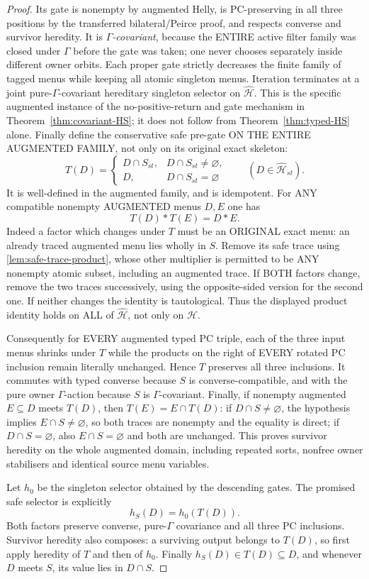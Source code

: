 \begin{proof}
Its gate is nonempty by augmented Helly,
is PC-preserving in all three positions
by the transferred bilateral/Peirce
proof, and respects converse and
survivor heredity. It is
\emph{$\Gamma$-covariant}, because the
ENTIRE active filter family was closed
under $\Gamma$ before the gate was taken;
one never chooses separately inside
different owner orbits.
Each proper gate strictly decreases the finite family of tagged
menus while keeping all atomic singleton menus.  Iteration
terminates at a joint pure-$\Gamma$-covariant hereditary
singleton selector on $\widehat{\mathcal H}$.  This is the
specific augmented instance of the no-positive-return and
gate mechanism in Theorem~\ref{thm:covariant-HS}; it does
not follow from Theorem~\ref{thm:typed-HS} alone.
Finally define the conservative safe
pre-gate ON THE ENTIRE AUGMENTED FAMILY,
not only on its original exact skeleton:
\[
 T(D)=\begin{cases}
    D\cap S_{st},&D\cap S_{st}\ne\varnothing,\\
    D,&D\cap S_{st}=\varnothing
      \end{cases}
      \qquad(D\in\widehat{\mathcal H}_{st}).
\]
It is well-defined in the augmented family,
and is idempotent. For ANY compatible
nonempty AUGMENTED menus $D,E$ one has
\[
                         T(D)*T(E)=D*E.
\]
Indeed a factor which changes under $T$
must be an ORIGINAL exact menu: an
already traced augmented menu lies wholly
in $S$. Remove its safe trace using
\cref{lem:safe-trace-product}, whose
other multiplier is permitted to be
ANY nonempty atomic subset, including an
augmented trace. If BOTH factors change,
remove the two traces successively,
using the opposite-sided version for
the second one. If neither changes the
identity is tautological. Thus the
displayed product identity holds on
ALL of $\widehat{\mathcal H}$, not only
on $\mathcal H$.

Consequently for EVERY augmented
typed PC triple, each of the three
input menus shrinks under $T$ while
the products on the right of EVERY
rotated PC inclusion remain literally
unchanged. Hence $T$ preserves all
three inclusions. It commutes with
typed converse because $S$ is
converse-compatible, and with the
pure owner $\Gamma$-action because
$S$ is $\Gamma$-covariant.
Finally, if nonempty augmented
$E\subseteq D$ meets $T(D)$,
then $T(E)=E\cap T(D)$:
if $D\cap S\ne\varnothing$, the
hypothesis implies $E\cap S\ne
\varnothing$, so both traces are
nonempty and the equality is direct;
if $D\cap S=\varnothing$, also
$E\cap S=\varnothing$ and both are
unchanged. This proves survivor
heredity on the whole augmented
domain, including repeated sorts,
nonfree owner stabilisers and
identical source menu variables.

Let $h_0$ be the singleton selector obtained by the descending gates.
The promised safe selector is explicitly
\[
                         h_S(D)=h_0(T(D)).
\]
Both factors preserve converse, pure-$\Gamma$ covariance and all three
PC inclusions. Survivor heredity also composes: a surviving output
belongs to $T(D)$, so first apply heredity of $T$ and then of $h_0$.
Finally $h_S(D)\in T(D)\subseteq D$, and whenever $D$ meets $S$,
its value lies in $D\cap S$.
\end{proof}

